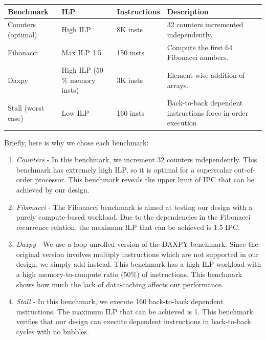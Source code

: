 \documentclass{article}
\begin{document}
\begin{center}
    \begin{tabular}{ | p{1.8cm} | p{1.9cm} | p{1.75cm} | p{5cm} |}
    \hline
    Benchmark & ILP & Instructions & Description \\ \hline
    Counters (optimal) & High ILP & 8K insts & 32 counters incremented
    independently. \\ \hline
    Fibonacci & Max ILP 1.5 & 150 insts & Compute the first 64 Fibonacci
    numbers. \\ \hline
    Daxpy & High ILP (50 \% memory insts) & 3K insts & Element-wise addition of
    arrays. \\ \hline
    Stall (worst case) & Low ILP & 160 insts & Back-to-back dependent
    instructions force in-order execution \\
    \hline
    \end{tabular}
\end{center}

Briefly, here is why we chose each benchmark:
\begin{enumerate}
    \item \textit{Counters} - In this benchmark, we increment 32 counters
        independently. This benchmark has extremely high ILP, so it is optimal
        for a superscalar out-of-order processor. This benchmark reveals the
        upper limit of IPC that can be achieved by our design.

    \item \textit{Fibonacci} - The Fibonacci benchmark is aimed at testing
        our design with a purely compute-based workload. Due to the
        dependencies in the Fibonacci recurrence relation, the maximum ILP that
        can be achieved is 1.5 IPC.

    \item \textit{Daxpy} - We use a loop-unrolled version of the DAXPY
        benchmark. Since the original version involves multiply instructions
        which are not supported in our design, we simply add instead. This
        benchmark has a high ILP workload with a high memory-to-compute ratio
        (50\%) of instructions. This benchmark shows how much the lack of
        data-caching affects our performance.

    \item \textit{Stall} - In this benchmark, we execute 160 back-to-back
        dependent instructions. The maximum ILP that can be achieved is 1. This
        benchmark verifies that our design can execute dependent instructions in
        back-to-back cycles with no bubbles.
\end{enumerate}
\end{document}
